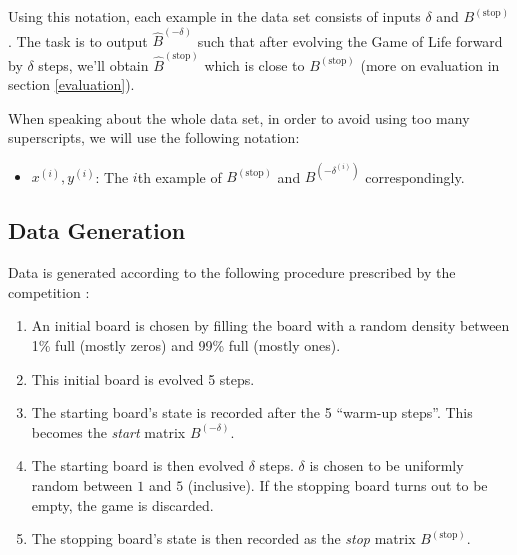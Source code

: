 \documentclass[conference]{IEEEtran}
\begin{document}
Using this notation, each example in the data set consists of inputs $\delta$ and $B^{(\text{stop})}$. The task is to output $\hat B^{(-\delta)}$ such that after evolving the Game of Life forward by $\delta$ steps, we'll obtain $\hat B^{(\text{stop})}$ which is close to $B^{(\text{stop})}$ (more on evaluation in section \ref{evaluation}).

When speaking about the whole data set, in order to avoid using too many superscripts, we will use the following notation:

\begin{itemize}
    \item $x^{(i)}, y^{(i)}$: The $i$th example of $B^{(\text{stop})}$ and $B^{(-\delta^{(i)})}$ correspondingly. %
\end{itemize}


\subsection{Data Generation}
Data is generated according to the following procedure prescribed by the competition \cite{b1}:

\begin{enumerate}
\item An initial board is chosen by filling the board with a random density between 1\% full (mostly zeros) and 99\% full (mostly ones).
\item This initial board is evolved 5 steps.
\item The starting board's state is recorded after the 5 ``warm-up steps''. This becomes the {\it start} matrix $B^{(-\delta)}$.
\item The starting board is then evolved $\delta$ steps. $\delta$ is chosen to be uniformly random between $1$ and $5$ (inclusive). If the stopping board turns out to be empty, the game is discarded.
\item The stopping board's state is then recorded as the {\it stop} matrix $B^{(\text{stop})}$.
\end{enumerate}
\end{document}
